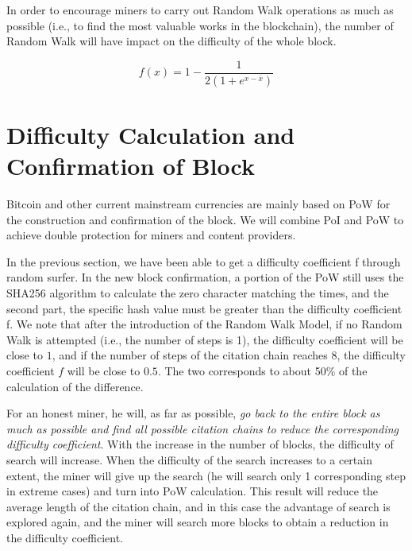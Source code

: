 \documentclass[a4paper,oneside,openany]{tufte-book}
\begin{document}
In order to encourage miners to carry out Random Walk operations as much as possible (i.e., to find the most valuable works in the blockchain), the number of Random Walk will have impact on the difficulty of the whole block.


\[
f(x)=1-\frac{1}{2(1+e^{x-\overline{x}})}
\]


\section{Difficulty Calculation and Confirmation of Block}


Bitcoin and other current mainstream currencies are mainly based on PoW for the construction and confirmation of the block. We will combine PoI and PoW to achieve double protection for miners and content providers.



In the previous section, we have been able to get a difficulty coefficient f through random surfer. In the new block confirmation, a portion of the PoW still uses the SHA256 algorithm to calculate the zero character matching the times, and the second part, the specific hash value must be greater than the difficulty coefficient f. We note that after the introduction of the Random Walk Model, if no Random Walk is attempted (i.e., the number of steps is 1), the difficulty coefficient will be close to $1$, and if the number of steps of the citation chain reaches 8, the difficulty coefficient $f$ will be close to $0.5$. The two corresponds to about 50\% of the calculation of the difference.



For an honest miner, he will, as far as possible, \emph{go back to the entire block as much as possible and find all possible citation chains to reduce the corresponding difficulty coefficient}. With the increase in the number of blocks, the difficulty of search will increase. When the difficulty of the search increases to a certain extent, the miner will give up the search (he will search only 1 corresponding step in extreme cases) and turn into PoW calculation. This result will reduce the average length of the citation chain, and in this case the advantage of search is explored again, and the miner will search more blocks to obtain a reduction in the difficulty coefficient.
\end{document}
